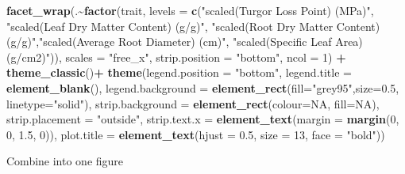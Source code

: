 \documentclass[
]{article}
\newenvironment{Shaded}{\begin{snugshade}}{\end{snugshade}}
\newcommand{\DataTypeTok}[1]{\textcolor[rgb]{0.13,0.29,0.53}{#1}}
\newcommand{\DecValTok}[1]{\textcolor[rgb]{0.00,0.00,0.81}{#1}}
\newcommand{\FloatTok}[1]{\textcolor[rgb]{0.00,0.00,0.81}{#1}}
\newcommand{\KeywordTok}[1]{\textcolor[rgb]{0.13,0.29,0.53}{\textbf{#1}}}
\newcommand{\NormalTok}[1]{#1}
\newcommand{\OperatorTok}[1]{\textcolor[rgb]{0.81,0.36,0.00}{\textbf{#1}}}
\newcommand{\OtherTok}[1]{\textcolor[rgb]{0.56,0.35,0.01}{#1}}
\newcommand{\StringTok}[1]{\textcolor[rgb]{0.31,0.60,0.02}{#1}}
\begin{document}
\begin{Shaded}
\begin{Highlighting}[]
\StringTok{  }\KeywordTok{facet\_wrap}\NormalTok{(.}\OperatorTok{\textasciitilde{}}\KeywordTok{factor}\NormalTok{(trait, }\DataTypeTok{levels =} \KeywordTok{c}\NormalTok{(}\StringTok{"scaled(Turgor Loss Point) (MPa)"}\NormalTok{, }\StringTok{"scaled(Leaf Dry Matter Content) (g/g)"}\NormalTok{, }\StringTok{"scaled(Root Dry Matter Content) (g/g)"}\NormalTok{,}\StringTok{"scaled(Average Root Diameter) (cm)"}\NormalTok{, }\StringTok{"scaled(Specific Leaf Area) (g/cm2)"}\NormalTok{)), }\DataTypeTok{scales =} \StringTok{"free\_x"}\NormalTok{, }\DataTypeTok{strip.position =}  \StringTok{"bottom"}\NormalTok{, }\DataTypeTok{ncol =} \DecValTok{1}\NormalTok{) }\OperatorTok{+}
\StringTok{  }\KeywordTok{theme\_classic}\NormalTok{()}\OperatorTok{+}
\StringTok{  }\KeywordTok{theme}\NormalTok{(}\DataTypeTok{legend.position =} \StringTok{"bottom"}\NormalTok{, }\DataTypeTok{legend.title =} \KeywordTok{element\_blank}\NormalTok{(), }\DataTypeTok{legend.background =} \KeywordTok{element\_rect}\NormalTok{(}\DataTypeTok{fill=}\StringTok{"grey95"}\NormalTok{,}\DataTypeTok{size=}\FloatTok{0.5}\NormalTok{, }\DataTypeTok{linetype=}\StringTok{"solid"}\NormalTok{), }\DataTypeTok{strip.background =} \KeywordTok{element\_rect}\NormalTok{(}\DataTypeTok{colour=}\OtherTok{NA}\NormalTok{, }\DataTypeTok{fill=}\OtherTok{NA}\NormalTok{), }\DataTypeTok{strip.placement =} \StringTok{"outside"}\NormalTok{, }\DataTypeTok{strip.text.x =} \KeywordTok{element\_text}\NormalTok{(}\DataTypeTok{margin =} \KeywordTok{margin}\NormalTok{(}\DecValTok{0}\NormalTok{, }\DecValTok{0}\NormalTok{, }\FloatTok{1.5}\NormalTok{, }\DecValTok{0}\NormalTok{)), }\DataTypeTok{plot.title =} \KeywordTok{element\_text}\NormalTok{(}\DataTypeTok{hjust =} \FloatTok{0.5}\NormalTok{, }\DataTypeTok{size =} \DecValTok{13}\NormalTok{, }\DataTypeTok{face =} \StringTok{"bold"}\NormalTok{))}
\end{Highlighting}
\end{Shaded}

Combine into one figure
\end{document}
